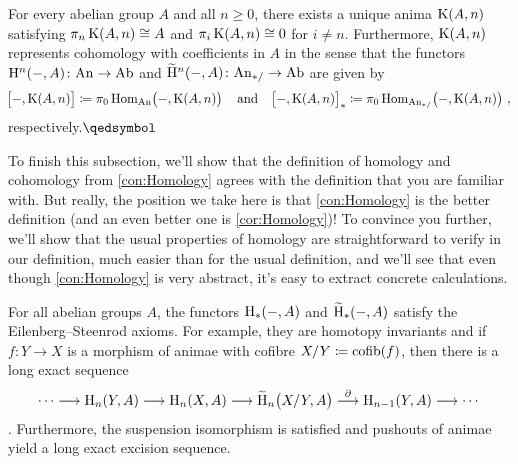 \begin{thm}\label{thm:EilenbergMacLane}
	For every abelian group $A$ and all $n\geqslant 0$, there exists a unique  anima $\operatorname{K}(A,n)$ satisfying $\pi_n\operatorname{K}(A,n)\cong A$ and $\pi_i\operatorname{K}(A,n)\cong0$ for $i\neq n$. Furthermore, $\operatorname{K}(A,n)$ represents cohomology with coefficients in $A$  in the sense that the functors $\mathrm{H}^n(-,A)\colon \mathrm{An}\rightarrow \mathrm{Ab}$ and $\widetilde{\mathrm{H}}^n(-,A)\colon \mathrm{An}_{*/}\rightarrow \mathrm{Ab}$ are given by
	\begin{equation*}
		\lef[-,\K(A,n)\righ]\coloneqq\pi_0\Hom_{\cat{An}}\lef(-,\K(A,n)\righ)\quad\text{and}\quad \lef[-,\K(A,n)\righ]_*\coloneqq\pi_0\Hom_{\cat{An}_{*/}}\lef(-,\K(A,n)\righ)\,,
	\end{equation*}
	respectively.\hfill$\qedsymbol$
\end{thm}
To finish this subsection, we'll show that the definition of homology and cohomology from \cref{con:Homology} agrees with the definition that you are familiar with. But really, the position we take here is that \cref{con:Homology} is the better definition (and an even better one is \cref{cor:Homology})! To convince you further, we'll show that the usual properties of homology are straightforward to verify in our definition, much easier than for the usual definition, and we'll see that even though \cref{con:Homology} is very abstract, it's easy to extract concrete calculations.
\begin{lem}\label{lem:HomologyEasier}
	For all abelian groups $A$, the functors $\mathrm{H}_*(-,A)$ and $\widetilde{\mathrm{H}}_*(-,A)$ satisfy the Eilenberg--Steenrod axioms. For example, they are homotopy invariants and if $f\colon Y\rightarrow X$ is a morphism of animae with cofibre $X/Y\coloneqq\operatorname{cofib}(f)$, then there is a long exact sequence
	\begin{equation*}
		\dotsb\longrightarrow\H_n\!\left(Y,A\right)\longrightarrow\H_n\!\left(X,A\right)\longrightarrow\widetilde{\H}_n\lef(X/Y,A\righ)\overset{\partial}{\longrightarrow}\H_{n-1}\!\left(Y,A\right)\longrightarrow\dotsb
	\end{equation*}
	. Furthermore, the suspension isomorphism is satisfied and pushouts of animae yield a long exact excision sequence.
\end{lem}
